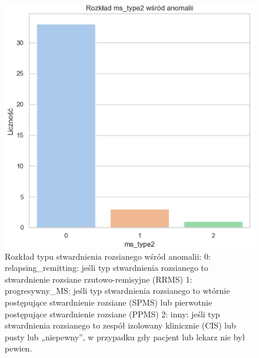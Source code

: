 \documentclass[a4paper,fleqn]{cas-dc}
\begin{document}
\begin{figure}[h]
	\includegraphics[scale=.73]{wykresy/wykres9.png}
	\caption{Rozkład typu stwardnienia rozsianego wśród anomalii:  0: relapsing\_remitting: jeśli typ stwardnienia rozsianego to stwardnienie rozsiane rzutowo-remisyjne (RRMS)
1: progresywny\_MS: jeśli typ stwardnienia rozsianego to wtórnie postępujące stwardnienie rozsiane (SPMS) lub pierwotnie postępujące stwardnienie rozsiane (PPMS)
2: inny: jeśli typ stwardnienia rozsianego to zespół izolowany klinicznie (CIS) lub pusty lub „niepewny”, w przypadku gdy pacjent lub lekarz nie był pewien.}
	\label{FIG:1}
\end{figure}
\end{document}
